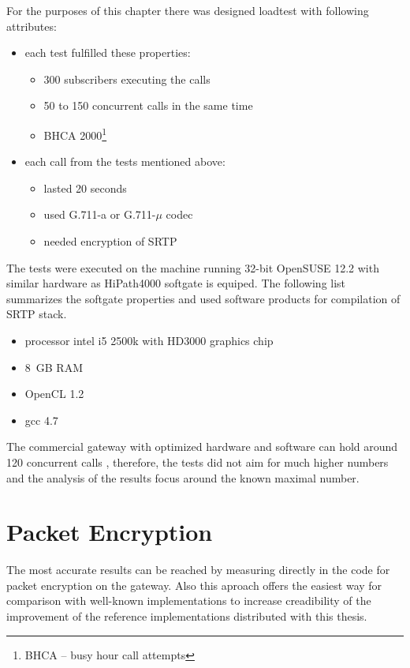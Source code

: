 For the purposes of this chapter there was designed loadtest with following
attributes:
\begin{itemize}
\item each test fulfilled these properties:
\vspace{-0.5em}
\begin{itemize}
\item 300 subscribers executing the calls
\item 50 to 150 concurrent calls in the same time\cite{hp4k}
\item BHCA 2000\footnote{ BHCA -- busy hour call attempts}
\end{itemize}
\item each call from the tests mentioned above:
\vspace{-0.5em}
\begin{itemize}
\item lasted 20 seconds
\item used G.711-a or G.711-$\mu$ codec
\item needed encryption of SRTP
\end{itemize}
\end{itemize}


The tests were executed on the machine running 32-bit OpenSUSE 12.2 with similar
hardware as HiPath4000 softgate is equiped. The following list summarizes the
softgate properties and used software products for compilation of SRTP stack.
\begin{itemize}
\item processor intel i5 2500k with HD3000 graphics chip
\item 8~GB RAM
\item OpenCL 1.2
\item gcc 4.7
\end{itemize}
 
The commercial gateway with optimized hardware and software can hold around 120 
concurrent calls \cite{hp4k}, therefore, the tests did not aim for much higher
numbers and the analysis of the results focus around the known maximal number. 

\section{Packet Encryption}
The most accurate results can be reached by measuring directly in the code for
packet encryption on the gateway. Also this aproach offers the easiest way
for comparison with well-known implementations to increase creadibility of 
the improvement of the reference implementations distributed with this thesis. 

